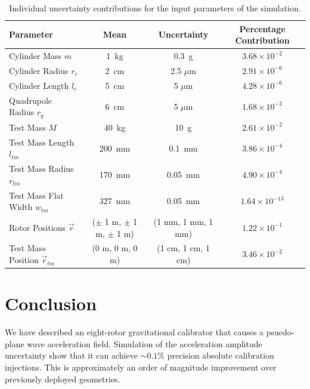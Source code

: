 \documentclass[superscriptaddress, twocolumn, prd]{revtex4-1}
\begin{document}
\begin{widetext}
\begingroup
\setlength{\tabcolsep}{10pt} %
\renewcommand{\arraystretch}{1.5} %

\begin{table}[h!]
\begin{center}
\begin{tabular}{ |l|c|c|c| }
\hline
 Parameter & Mean & Uncertainty & Percentage Contribution\\
 \hline
Cylinder Mass $m$ & 1~kg & 0.3~g & $3.68\times10^{-2}$\\
Cylinder Radius $r_c$& 2~cm & 2.5 $\mu$m & $2.91\times10^{-6}$\\
Cylinder Length $l_c$& 5~cm & 5 $\mu$m & $4.28\times10^{-6}$\\
Quadrupole Radius $r_{q}$ & 6~cm & 5 $\mu$m &$1.68\times10^{-2}$\\
Test Mass $M$ & 40~kg & 10~g & $2.61\times10^{-2}$\\
Test Mass Length $l_{tm}$& 200~mm & 0.1~mm& $3.86\times10^{-4}$\\
Test Mass Radius $r_{tm}$& 170~mm & 0.05~mm& $4.90\times10^{-4}$\\
Test Mass Flat Width $w_{tm}$& 327~mm & 0.05~mm&$1.64\times10^{-13}$\\
Rotor Positions $\vec{r}$& ($\pm$ 1 m, $\pm$ 1 m, $\pm$ 1 m) & (1 mm, 1 mm, 1 mm) &$1.22\times10^{-1}$\\
Test Mass Position $\vec{r}_{tm}$& (0 m, 0 m, 0 m) & (1 cm, 1 cm, 1 cm) &$3.46\times10^{-2}$\\
 \hline

 \end{tabular}
 \caption{Individual uncertainty contributions for the input parameters of the simulation.}\label{uncert}
 \end{center}

\end{table}
\endgroup
\end{widetext}

\section{Conclusion}
 
\quad We have described an eight-rotor gravitational calibrator that causes a psuedo-plane wave acceleration field. Simulation of the acceleration amplitude uncertainty show that it can achieve $\sim0.1\%$ precision absolute calibration injections. This is approximately an order of magnitude improvement over previously deployed geometries. 
\end{document}
